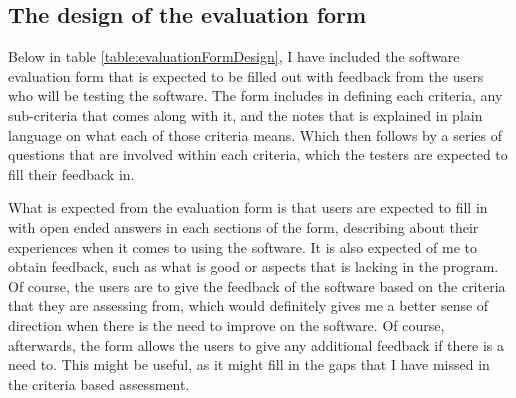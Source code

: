 

\subsection{The design of the evaluation form}
Below in table \ref{table:evaluationFormDesign}, I have included the software evaluation form that is expected to be filled out with feedback from the users who will be testing the software. The form includes in defining each criteria, any sub-criteria that comes along with it, and the notes that is explained in plain language on what each of those criteria means. Which then follows by a series of questions that are involved within each criteria, which the testers are expected to fill their feedback in. 

What is expected from the evaluation form is that users are expected to fill in with open ended answers in each sections of the form, describing about their experiences when it comes to using the software. It is also expected of me to obtain feedback, such as what is good or aspects that is lacking in the program. Of course, the users are to give the feedback of the software based on the criteria that they are assessing from, which would definitely gives me a better sense of direction when there is the need to improve on the software. Of course, afterwards, the form allows the users to give any additional feedback if there is a need to. This might be useful, as it might fill in the gaps that I have missed in the criteria based assessment.

